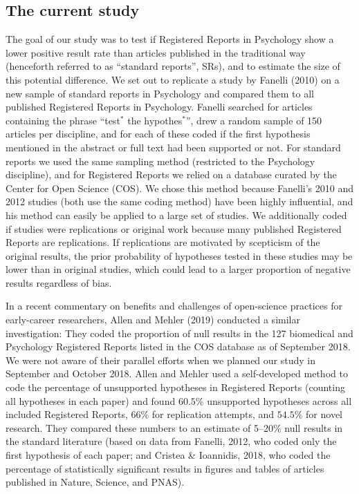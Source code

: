 \documentclass[british,,jou,floatsintext]{apa6}
\begin{document}
\hypertarget{the-current-study}{%
\subsection{The current study}\label{the-current-study}}

The goal of our study was to test if Registered Reports in Psychology show a lower positive result rate than articles published in the traditional way (henceforth referred to as \enquote{standard reports}, SRs), and to estimate the size of this potential difference.
We set out to replicate a study by Fanelli (2010) on a new sample of standard reports in Psychology and compared them to all published Registered Reports in Psychology.
Fanelli searched for articles containing the phrase \enquote{test\(^\ast\) the hypothes\(^\ast\)}, drew a random sample of 150 articles per discipline, and for each of these coded if the first hypothesis mentioned in the abstract or full text had been supported or not.
For standard reports we used the same sampling method (restricted to the Psychology discipline), and for Registered Reports we relied on a database curated by the Center for Open Science (COS).
We chose this method because Fanelli's 2010 and 2012 studies (both use the same coding method) have been highly influential, and his method can easily be applied to a large set of studies.
We additionally coded if studies were replications or original work because many published Registered Reports are replications.
If replications are motivated by scepticism of the original results, the prior probability of hypotheses tested in these studies may be lower than in original studies, which could lead to a larger proportion of negative results regardless of bias.

In a recent commentary on benefits and challenges of open-science practices for early-career researchers, Allen and Mehler (2019) conducted a similar investigation:
They coded the proportion of null results in the 127 biomedical and Psychology Registered Reports listed in the COS database as of September 2018.
We were not aware of their parallel efforts when we planned our study in September and October 2018.
Allen and Mehler used a self-developed method to code the percentage of unsupported hypotheses in Registered Reports (counting all hypotheses in each paper) and found \(60.5\%\) unsupported hypotheses across all included Registered Reports, \(66\%\) for replication attempts, and \(54.5\%\) for novel research.
They compared these numbers to an estimate of 5--20\(\%\) null results in the standard literature (based on data from Fanelli, 2012, who coded only the first hypothesis of each paper; and Cristea \& Ioannidis, 2018, who coded the percentage of statistically significant results in figures and tables of articles published in Nature, Science, and PNAS).
\end{document}
